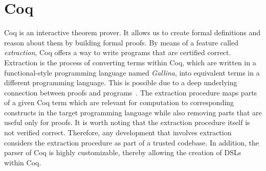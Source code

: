 
\section{Coq}
Coq is an interactive theorem prover. It allows us to create formal
definitions and reason about them by building formal proofs.
By means of a feature called \emph{extraction}, Coq offers a way to
write programs that are certified correct.
Extraction is the process of converting terms within Coq, which are
written in a functional-style programming language named
\emph{Gallina}, into equivalent terms in a different programming
language.
%
This is possible due to a deep underlying connection between proofs
and programs~\cite{howard1980formulae}.
The extraction procedure maps parts of a given Coq term which are
relevant for computation to corresponding constructs in the target
programming language while also removing parts that are useful only
for proofs.
It is worth noting that the extraction procedure itself is not
verified correct.
Therefore, any development that involves extraction considers the
extraction procedure as part of a trusted codebase.
In addition, the parser of Coq is highly customizable, thereby
allowing the creation of \glspl{DSL} within Coq.


